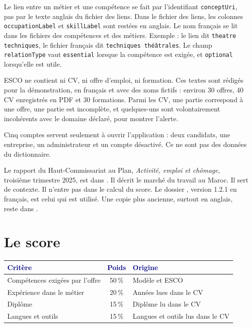\documentclass[11pt,a4paper]{article}
\begin{document}
Le lien entre un métier et une compétence se fait par l'identifiant \texttt{conceptUri}, pas par le texte anglais du fichier des liens. Dans le fichier des liens, les colonnes \texttt{occupationLabel} et \texttt{skillLabel} sont restées en anglais. Le nom français se lit dans les fichiers des compétences et des métiers. Exemple : le lien dit \texttt{theatre techniques}, le fichier français dit \texttt{techniques théâtrales}. Le champ \texttt{relationType} vaut \texttt{essential} lorsque la compétence est exigée, et \texttt{optional} lorsqu'elle est utile.

ESCO ne contient ni CV, ni offre d'emploi, ni formation. Ces textes sont rédigés pour la démonstration, en français et avec des noms fictifs : environ 30 offres, 40 CV enregistrés en PDF et 30 formations. Parmi les CV, une partie correspond à une offre, une partie est incomplète, et quelques-uns sont volontairement incohérents avec le domaine déclaré, pour montrer l'alerte.

Cinq comptes servent seulement à ouvrir l'application : deux candidats, une entreprise, un administrateur et un compte désactivé. Ce ne sont pas des données du dictionnaire.

Le rapport du Haut-Commissariat au Plan, \emph{Activité, emploi et chômage}, troisième trimestre 2025, est dans . Il décrit le marché du travail au Maroc. Il sert de contexte. Il n'entre pas dans le calcul du score. Le dossier , version 1.2.1 en français, est celui qui est utilisé. Une copie plus ancienne, surtout en anglais, reste dans .

\section{Le score}

\begin{table}[ht]
\centering
\renewcommand{\arraystretch}{1.28}
\begin{tabularx}{\textwidth}{>{\raggedright\arraybackslash}p{5.3cm} c X}
\toprule
\textcolor{navy}{\bfseries Critère} & \textcolor{navy}{\bfseries Poids} & \textcolor{navy}{\bfseries Origine} \\
\midrule
Compétences exigées par l'offre & 50\,\% & Modèle et ESCO \\
Expérience dans le métier & 20\,\% & Années lues dans le CV \\
Diplôme & 15\,\% & Diplôme lu dans le CV \\
Langues et outils & 15\,\% & Langues et outils lus dans le CV \\
\bottomrule
\end{tabularx}
\end{table}
\end{document}
